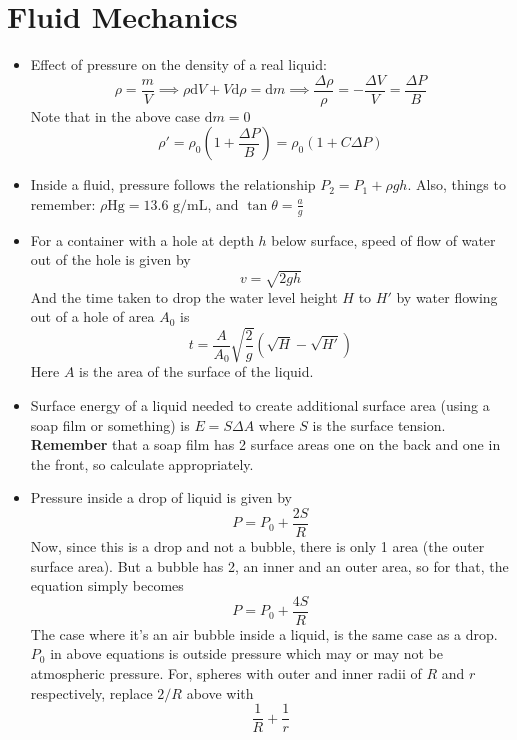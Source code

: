 \documentclass{scrartcl}
\begin{document}
    \section{Fluid Mechanics}
    \begin{itemize}
        \item Effect of pressure on the density of a real liquid: \[\rho=\frac mV\implies\rho\mathrm dV+V\mathrm d\rho=\mathrm dm\implies\frac{\Delta\rho}{\rho}=-\frac{\Delta V}V=\frac{\Delta P}B\] Note that in the above case $\mathrm dm=0$\[\rho'=\rho_0\left(1+\frac{\Delta P}B\right)=\rho_0(1+C\Delta P)\]
        \item Inside a fluid, pressure follows the relationship $P_2=P_1+\rho gh$. Also, things to remember: $\rho\text{Hg}=13.6\text{ g/mL}$, and $\tan\theta=\frac ag$
        \item For a container with a hole at depth $h$  below surface, speed of flow of water out of the hole is given by \[v=\sqrt{2gh}\] And the time taken to drop the water level height $H$  to $H'$  by water flowing out of a hole of area $A_0$ is \[t=\frac A{A_0}\sqrt{\frac 2g}\left(\sqrt H-\sqrt{H'}\right)\] Here $A$  is the area of the surface of the liquid.
        \item Surface energy of a liquid needed to create additional surface area (using a soap film or something) is $E=S\Delta A$ where $S$ is the surface tension. \textbf{Remember} that a soap film has 2 surface areas one on the back and one in the front, so calculate appropriately.
        \item Pressure inside a drop of liquid is given by \[P=P_0+\frac{2S}R\] Now, since this is a drop and not a bubble, there is only 1 area (the outer surface area). But a bubble has 2, an inner and an outer area, so for that, the equation simply becomes \[P=P_0+\frac{4S}R\] The case where it's an air bubble inside a liquid, is the same case as a drop. $P_0$  in above equations is outside pressure which may or may not be atmospheric pressure. For, spheres with outer and inner radii of $R$ and $r$ respectively, replace $2/R$  above with \[\frac 1R+\frac 1r\]

\end{itemize}
\end{document}
